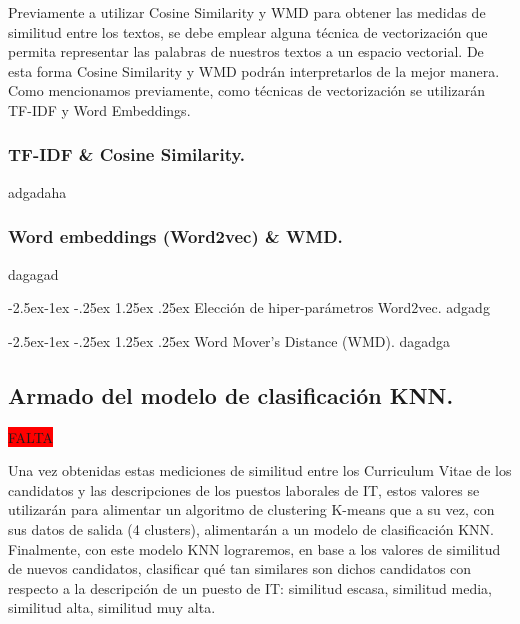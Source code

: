 \documentclass[12pt,a4paper]{article}
\makeatletter
\renewcommand\paragraph{\@startsection{paragraph}{4}{\z@}
            {-2.5ex\@plus -1ex \@minus -.25ex}
            {1.25ex \@plus .25ex}
            {\normalfont\normalsize\bfseries}}
\makeatother
\begin{document}
\begin{sloppypar}
Previamente a utilizar Cosine Similarity y WMD para obtener las medidas de similitud entre los textos, se debe emplear alguna técnica de vectorización que permita representar las palabras de nuestros textos a un espacio vectorial. De esta forma Cosine Similarity y WMD podrán interpretarlos de la mejor manera.  Como mencionamos previamente, como técnicas de vectorización se utilizarán TF-IDF y Word Embeddings. 

\cleardoublepage

\subsubsection{TF-IDF \& Cosine Similarity.}
adgadaha
\cleardoublepage

\subsubsection{Word embeddings (Word2vec) \& WMD.}\label{Implementacion_word_emb_y_wmd}
dagagad
\cleardoublepage

\paragraph{Elección de hiper-parámetros Word2vec.}\label{hiper_par_word2vec}
adgadg
\cleardoublepage

\paragraph{Word Mover's Distance (WMD).}
dagadga
\cleardoublepage


\subsection{Armado del modelo de clasificación KNN.}\label{IMP_Modelo_clasificacion_KNN}
\colorbox{red}{FALTA}

Una vez obtenidas estas mediciones de similitud entre los Curriculum Vitae de los candidatos y las descripciones de los puestos laborales de IT, estos valores se utilizarán para alimentar un algoritmo de clustering K-means que a su vez, con sus datos de salida (4 clusters), alimentarán a un modelo de clasificación KNN. Finalmente, con este modelo KNN lograremos, en base a los valores de similitud de nuevos candidatos, clasificar qué tan similares son dichos candidatos con respecto a la descripción de un puesto de IT: similitud escasa, similitud media, similitud alta, similitud muy alta.


\end{sloppypar}
\end{document}
